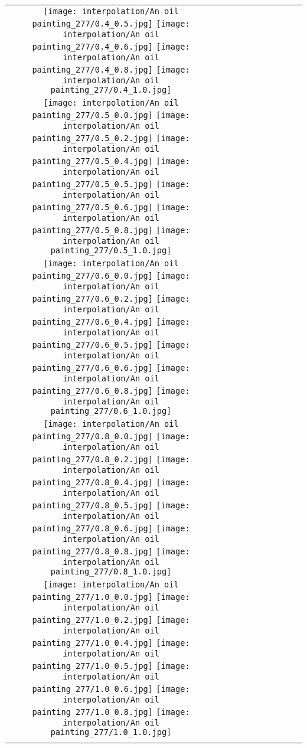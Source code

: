 \documentclass[10pt,twocolumn,letterpaper]{article}
\begin{document}
\begin{figure*}[tb!]
{\begin{tabular}{c c c c c c c c c c}
  \texttt{[image: interpolation/An oil painting\_277/0.4\_0.5.jpg]}
  \texttt{[image: interpolation/An oil painting\_277/0.4\_0.6.jpg]}
  \texttt{[image: interpolation/An oil painting\_277/0.4\_0.8.jpg]}
  \texttt{[image: interpolation/An oil painting\_277/0.4\_1.0.jpg]}
\tabularnewline
    \raisebox{0.1in}{\rotatebox{90}{\small \emph{}
 }}
  \texttt{[image: interpolation/An oil painting\_277/0.5\_0.0.jpg]}
  \texttt{[image: interpolation/An oil painting\_277/0.5\_0.2.jpg]}
  \texttt{[image: interpolation/An oil painting\_277/0.5\_0.4.jpg]}
  \texttt{[image: interpolation/An oil painting\_277/0.5\_0.5.jpg]}
  \texttt{[image: interpolation/An oil painting\_277/0.5\_0.6.jpg]}
  \texttt{[image: interpolation/An oil painting\_277/0.5\_0.8.jpg]}
  \texttt{[image: interpolation/An oil painting\_277/0.5\_1.0.jpg]}
\tabularnewline
    \raisebox{0.1in}{\rotatebox{90}{\small \emph{}
 }}
  \texttt{[image: interpolation/An oil painting\_277/0.6\_0.0.jpg]}
  \texttt{[image: interpolation/An oil painting\_277/0.6\_0.2.jpg]}
  \texttt{[image: interpolation/An oil painting\_277/0.6\_0.4.jpg]}
  \texttt{[image: interpolation/An oil painting\_277/0.6\_0.5.jpg]}
  \texttt{[image: interpolation/An oil painting\_277/0.6\_0.6.jpg]}
  \texttt{[image: interpolation/An oil painting\_277/0.6\_0.8.jpg]}
  \texttt{[image: interpolation/An oil painting\_277/0.6\_1.0.jpg]}
\tabularnewline
    \raisebox{0.1in}{\rotatebox{90}{\small \emph{}
 }}
  \texttt{[image: interpolation/An oil painting\_277/0.8\_0.0.jpg]}
  \texttt{[image: interpolation/An oil painting\_277/0.8\_0.2.jpg]}
   \texttt{[image: interpolation/An oil painting\_277/0.8\_0.4.jpg]}
  \texttt{[image: interpolation/An oil painting\_277/0.8\_0.5.jpg]}
  \texttt{[image: interpolation/An oil painting\_277/0.8\_0.6.jpg]}
  \texttt{[image: interpolation/An oil painting\_277/0.8\_0.8.jpg]}
  \texttt{[image: interpolation/An oil painting\_277/0.8\_1.0.jpg]}
\tabularnewline
    \raisebox{0.1in}{\rotatebox{90}{\small \emph{}
 }}
  \texttt{[image: interpolation/An oil painting\_277/1.0\_0.0.jpg]}
  \texttt{[image: interpolation/An oil painting\_277/1.0\_0.2.jpg]}
   \texttt{[image: interpolation/An oil painting\_277/1.0\_0.4.jpg]}
  \texttt{[image: interpolation/An oil painting\_277/1.0\_0.5.jpg]}
  \texttt{[image: interpolation/An oil painting\_277/1.0\_0.6.jpg]}
  \texttt{[image: interpolation/An oil painting\_277/1.0\_0.8.jpg]}
  \texttt{[image: interpolation/An oil painting\_277/1.0\_1.0.jpg]}
    \tabularnewline
        \raisebox{0.1in}{\rotatebox{90}{
 }}
 \hspace{0.5mm}


\end{tabular}}
\end{figure*}
\end{document}
